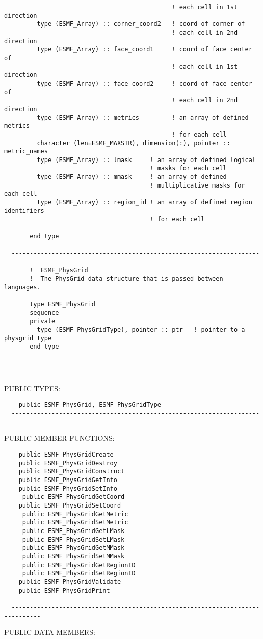 \begin{verbatim}
                                              ! each cell in 1st direction
         type (ESMF_Array) :: corner_coord2   ! coord of corner of
                                              ! each cell in 2nd direction
         type (ESMF_Array) :: face_coord1     ! coord of face center of
                                              ! each cell in 1st direction
         type (ESMF_Array) :: face_coord2     ! coord of face center of
                                              ! each cell in 2nd direction
         type (ESMF_Array) :: metrics         ! an array of defined metrics
                                              ! for each cell
         character (len=ESMF_MAXSTR), dimension(:), pointer :: metric_names
         type (ESMF_Array) :: lmask     ! an array of defined logical
                                        ! masks for each cell
         type (ESMF_Array) :: mmask     ! an array of defined
                                        ! multiplicative masks for each cell
         type (ESMF_Array) :: region_id ! an array of defined region identifiers
                                        ! for each cell
 
       end type
 
  ------------------------------------------------------------------------------
       !  ESMF_PhysGrid
       !  The PhysGrid data structure that is passed between languages.
 
       type ESMF_PhysGrid
       sequence
       private
         type (ESMF_PhysGridType), pointer :: ptr   ! pointer to a physgrid type
       end type
 
  ------------------------------------------------------------------------------\end{verbatim}{\sf PUBLIC TYPES:}
\begin{verbatim}    public ESMF_PhysGrid, ESMF_PhysGridType
  ------------------------------------------------------------------------------\end{verbatim}{\sf PUBLIC MEMBER FUNCTIONS:}
\begin{verbatim}    public ESMF_PhysGridCreate
    public ESMF_PhysGridDestroy
    public ESMF_PhysGridConstruct
    public ESMF_PhysGridGetInfo
    public ESMF_PhysGridSetInfo
     public ESMF_PhysGridGetCoord
    public ESMF_PhysGridSetCoord
     public ESMF_PhysGridGetMetric
     public ESMF_PhysGridSetMetric
     public ESMF_PhysGridGetLMask
     public ESMF_PhysGridSetLMask
     public ESMF_PhysGridGetMMask
     public ESMF_PhysGridSetMMask
     public ESMF_PhysGridGetRegionID
     public ESMF_PhysGridSetRegionID
    public ESMF_PhysGridValidate
    public ESMF_PhysGridPrint
  
  ------------------------------------------------------------------------------\end{verbatim}{\sf PUBLIC DATA MEMBERS:}
